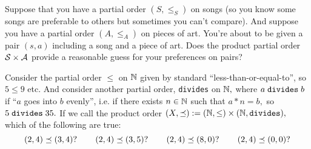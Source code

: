\documentclass[../main/CT4S-EN-RU]{subfiles}
\begin{document}
\begin{exampleRUS}\label{ex:product of preorders}
\end{exampleRUS}

\begin{exerciseENG}
Suppose that you have a partial order $(S,\leq_S)$ on songs (so you know some songs are preferable to others but sometimes you can't compare). And suppose you have a partial order $(A,\leq_A)$ on pieces of art. You're about to be given a pair $(s,a)$ including a song and a piece of art. Does the product partial order $\mathcal{S}\times\mathcal{A}$ provide a reasonable guess for your preferences on pairs?  
\end{exerciseENG}

\begin{exerciseRUS}
\end{exerciseRUS}

\begin{exerciseENG}\label{exc:divides as po}
Consider the partial order $\leq$ on ${\mathbb N}$ given by standard “less-than-or-equal-to”, so $5\leq 9$ etc. And consider another partial order, {\tt divides} on ${\mathbb N},$ where $a\;{\tt divides}\;b$ if “$a$ goes into $b$ evenly”, i.e. if there exists $n\in{\mathbb N}$ such that $a*n=b,$ so $5\;{\tt divides}\;35.$ If we call the product order $(X,\preceq):=({\mathbb N},\leq)\times({\mathbb N},{\tt divides}),$ which of the following are true: 
$$(2,4)\preceq(3,4)? \hspace{.3in} (2,4)\preceq(3,5)?\hspace{.3in} (2,4)\preceq (8,0)?\hspace{.3in} (2,4)\preceq(0,0)?$$
\end{exerciseENG}

\begin{exerciseRUS}\label{exc:divides as po}
\end{exerciseRUS}
\end{document}
